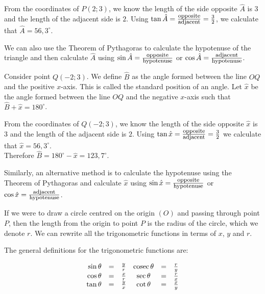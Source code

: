 From the coordinates of $P(2;3)$, we know the length of the side opposite $\hat{A}$ is $3$ and the length of the adjacent side is $2$. Using $\tan \hat{A}=\frac{\mbox{\footnotesize opposite}}{\mbox{\footnotesize adjacent}} = \frac{3}{2}$, we calculate that $\hat{A}=56,3^{\circ}$.\par
{}
We can also use the Theorem of Pythagoras to calculate the hypotenuse of the triangle and then calculate $\hat{A}$ using $\sin \hat{A} = \frac{\mbox{\footnotesize opposite}}{\mbox{\footnotesize hypotenuse}}$ or $\cos \hat{A} = \frac{\mbox{\footnotesize adjacent}}{\mbox{\footnotesize hypotenuse}}$. \par
Consider point $Q(-2;3)$. We define $\hat{B}$ as the angle formed between the line $OQ$ and the positive $x$-axis. This is called the standard position of an angle. Let $\hat{x}$ be the angle formed between the line $OQ$ and the negative $x$-axis such that $\hat{B} + \hat{x} = 180^{\circ}$.
\par

From the coordinates of $Q(-2;3)$, we know the length of the side opposite $\hat{x}$ is $3$ and the length of the adjacent side is $2$. Using $\tan \hat{x}=\frac{\mbox{\footnotesize opposite}}{\mbox{\footnotesize adjacent}} = \frac{3}{2}$ we calculate that $\hat{x}=56,3^{\circ}$.
\\Therefore $\hat{B}=180^{\circ} - \hat{x} = 123,7^{\circ}$.\par

Similarly, an alternative method is to calculate the hypotenuse using the Theorem of Pythagoras and calculate $\hat{x}$ using $\sin \hat{x} = \frac{\mbox{\footnotesize opposite}}{\mbox{\footnotesize hypotenuse}}$ or $\cos \hat{x} = \frac{\mbox{\footnotesize adjacent}}{\mbox{\footnotesize hypotenuse}}$. \par
If we were to draw a circle centred on the origin $(O)$ and passing through point $P$, then the length from the origin to point $P$ is the radius of the circle, which we denote $r$. We can rewrite all the trigonometric functions in terms of $x$, $y$ and $r$.


The general definitions for the trigonometric functions are:

\begin{equation*}
\begin{array}{cccccc}\hfill \sin \theta & =& \frac{y}{r}\hfill & \cosec \theta & =& \frac{r}{y}\hfill \\
 \hfill \cos \theta & =& \frac{x}{r}\hfill & \sec \theta & =& \frac{r}{x}\hfill \\
 \hfill \tan \theta & =& \frac{y}{x}\hfill & \cot \theta & =& \frac{x}{y}\hfill \end{array}
\end{equation*}

